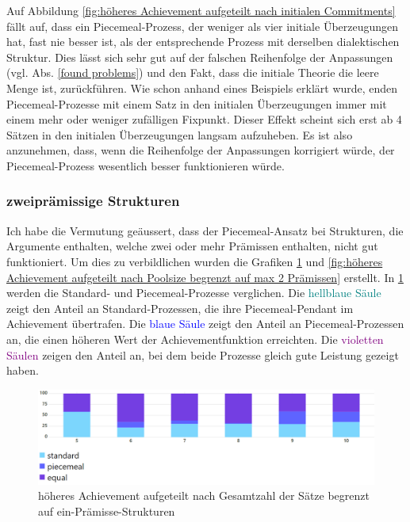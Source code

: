 \documentclass{article}
\begin{document}
Auf Abbildung \ref{fig:höheres Achievement aufgeteilt nach initialen Commitments} fällt auf, dass ein Piecemeal-Prozess, der weniger als vier initiale Überzeugungen hat, fast nie besser ist, als der entsprechende Prozess mit derselben dialektischen Struktur. Dies lässt sich sehr gut auf der falschen Reihenfolge der Anpassungen (vgl. Abs. \ref{found problems}) und den Fakt, dass die initiale Theorie die leere Menge ist, zurückführen. Wie schon anhand eines Beispiels erklärt wurde, enden Piecemeal-Prozesse mit einem Satz in den initialen Überzeugungen immer mit einem mehr oder weniger zufälligen Fixpunkt. Dieser Effekt scheint sich erst ab 4 Sätzen in den initialen Überzeugungen langsam aufzuheben. Es ist also anzunehmen, dass, wenn die Reihenfolge der Anpassungen korrigiert würde, der Piecemeal-Prozess wesentlich besser funktionieren würde.

\subsubsection{zweiprämissige Strukturen}

Ich habe die Vermutung geäussert, dass der Piecemeal-Ansatz bei Strukturen, die Argumente enthalten, welche zwei oder mehr Prämissen enthalten, nicht gut funktioniert. Um dies zu verbildlichen wurden die Grafiken \ref{fig:höheres Achievement aufgeteilt nach Poolsize begrenzt auf eine Prämisse} und \ref{fig:höheres Achievement aufgeteilt nach Poolsize begrenzt auf max 2 Prämissen} erstellt. In \ref{fig:höheres Achievement aufgeteilt nach Poolsize begrenzt auf eine Prämisse} werden die Standard- und Piecemeal-Prozesse verglichen. Die \textcolor{teal}{hellblaue Säule} zeigt den Anteil an Standard-Prozessen, die ihre Piecemeal-Pendant im Achievement übertrafen. Die \textcolor{blue}{blaue Säule} zeigt den Anteil an Piecemeal-Prozessen an, die einen höheren Wert der Achievementfunktion erreichten. Die \textcolor{purple}{violetten Säulen} zeigen den Anteil an, bei dem beide Prozesse gleich gute Leistung gezeigt haben.

\begin{figure}[ht]
  \centering
  \includegraphics[width=\textwidth]{höheres Achievement aufgeteilt nach Poolsize begrenzt auf eine Prämisse}
  \caption{höheres Achievement aufgeteilt nach Gesamtzahl der Sätze begrenzt auf ein-Prämisse-Strukturen\label{fig:höheres Achievement aufgeteilt nach Poolsize begrenzt auf eine Prämisse}}
\end{figure}
\end{document}
